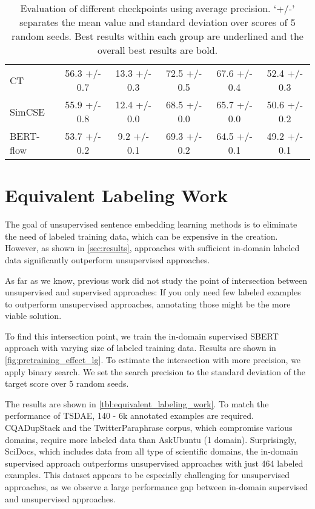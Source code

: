 \documentclass[11pt]{article}
\begin{document}
\begin{table}[H]
{\begin{tabular}{|l|c|c|c|c|c|}
CT        & 56.3 +/- 0.7                  & 13.3 +/- 0.3                  & 72.5 +/- 0.5                  & 67.6 +/- 0.4                  & 52.4 +/- 0.3                   \\
SimCSE & 55.9 +/- 0.8                  & 12.4 +/- 0.0                   & 68.5 +/- 0.0                  & 65.7 +/- 0.0                  & 50.6 +/- 0.2                   \\
BERT-flow & 53.7 +/- 0.2                  & 9.2 +/- 0.1                   & 69.3 +/- 0.2                  & 64.5 +/- 0.1                  & 49.2 +/- 0.1                   \\
\hline
\end{tabular}}
\caption{Evaluation of different checkpoints using average precision. `+/-' separates the mean value and standard deviation over scores of 5 random seeds. Best results within each group are underlined and the overall best results are bold.}
\label{tbl:other_checkpoints}
\end{table}





\section{Equivalent Labeling Work} 
The goal of unsupervised sentence embedding learning methods is to eliminate the need of labeled training data, which can be expensive in the creation. However, as shown in \autoref{sec:results}, approaches with sufficient in-domain labeled data significantly outperform unsupervised approaches. 

As far as we know, previous work did not study the point of intersection between unsupervised and supervised approaches: If you only need few labeled examples to outperform unsupervised approaches, annotating those might be the more viable solution.

To find this intersection point, we train the in-domain supervised SBERT approach with varying size of labeled training data. Results are shown in \autoref{fig:pretraining_effect_lg}. To estimate the intersection with more precision, we apply binary search. We set the search precision to the standard deviation of the target score over 5 random seeds.

The results are shown in \autoref{tbl:equivalent_labeling_work}. To match the performance of TSDAE, 140 - 6k annotated examples are required. CQADupStack and the TwitterParaphrase corpus, which compromise various domains, require more labeled data than AskUbuntu (1 domain). Surprisingly, SciDocs, which includes data from all type of scientific domains, the in-domain supervised approach outperforms unsupervised approaches with just 464 labeled examples. This dataset appears to be especially challenging for unsupervised approaches, as we observe a large performance gap between in-domain supervised and unsupervised approaches.
\end{document}
